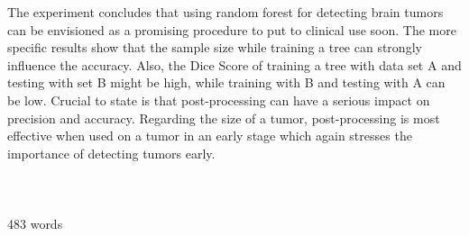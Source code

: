 \documentclass{article}
\begin{document}
 The experiment concludes that using random forest for detecting brain tumors can be envisioned as a promising procedure to put to clinical use soon. The more specific results show that the sample size while training a tree can strongly influence the accuracy. Also, the Dice Score of training a tree with data set A and testing with set B might be high, while training with B and testing with A can be low. Crucial to state is that post-processing can have a serious impact on precision and accuracy. Regarding the size of a tumor, post-processing is most effective when used on a tumor in an early stage which again stresses the importance of detecting tumors early. \\
 \\
 \\
 \\
 483 words
\end{document}
